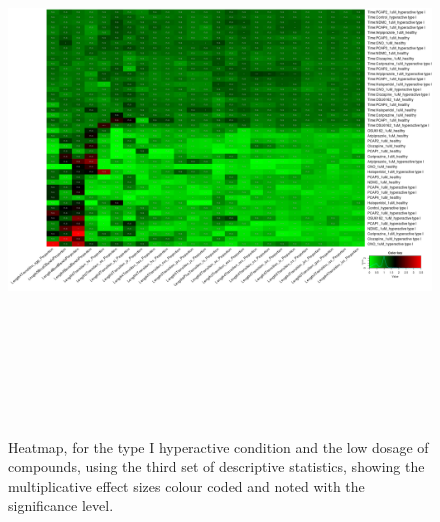 \documentclass[a4paper,12pt]{article}
\begin{document}
\begin{figure}[h!]
\begin{center}
\includegraphics[width=16cm,height=15cm]{DarkApoHigh_heatmap_1_microM_DarkApoHigh_B1MAP.png}
\caption{Heatmap, for the type I hyperactive condition and the low dosage of compounds, using the third set of descriptive statistics, showing the multiplicative effect sizes colour coded and noted with the significance level.}
\end{center}
\end{figure}
\newpage
\end{document}
